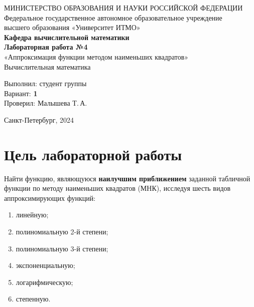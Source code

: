 \documentclass[12pt,a4paper]{article}
\begin{document}
\begin{titlepage}
\begin{center}
  \large
  МИНИСТЕРСТВО ОБРАЗОВАНИЯ И НАУКИ РОССИЙСКОЙ ФЕДЕРАЦИИ \\[0.5em]
  Федеральное государственное автономное образовательное учреждение \\
  высшего образования «Университет ИТМО» \\[2em]
  \textbf{Кафедра вычислительной математики} \\[4em]

  {\LARGE \textbf{Лабораторная работа №4}}\\[1em]
  {\Large «Аппроксимация функции методом наименьших квадратов»}\\[1em]
  {\large Вычислительная математика}\\[4em]

  \begin{flushright}
    Выполнил: студент группы \hrulefill\\[0.5em]
    Вариант: \textbf{1}\\[0.5em]
    Проверил: Малышева Т.\,А.\\
  \end{flushright}

  \vfill
  Санкт-Петербург, 2024
\end{center}
\end{titlepage}

\tableofcontents
\newpage

\section{Цель лабораторной работы}

Найти функцию, являющуюся \textbf{наилучшим приближением} заданной табличной
функции по методу наименьших квадратов (МНК), исследуя шесть видов
аппроксимирующих функций:
\begin{enumerate}
  \item линейную;
  \item полиномиальную 2-й степени;
  \item полиномиальную 3-й степени;
  \item экспоненциальную;
  \item логарифмическую;
  \item степенную.
\end{enumerate}
\end{document}
